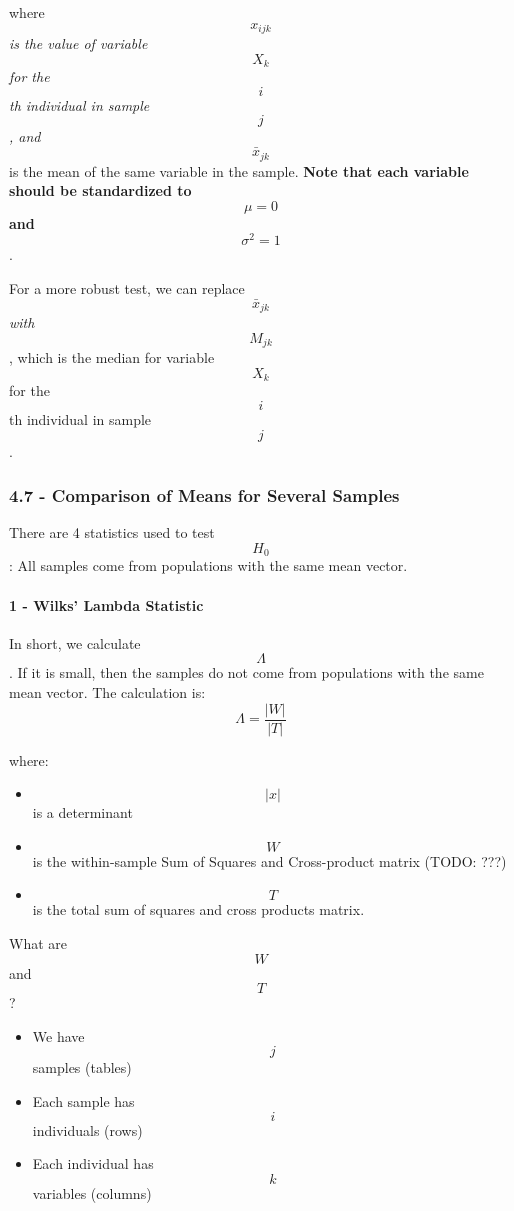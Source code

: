 where \[ x_{ijk} \] \emph{is the value of variable} \[X_k\] \emph{for
the} \[i\]\emph{th individual in sample} \[j\]\emph{, and}
\[\bar{x}_{jk}\] is the mean of the same variable in the sample.
\textbf{Note that each variable should be standardized to} \[\mu = 0\]
\textbf{and} \[\sigma^2 = 1\].

For a more robust test, we can replace \[\bar{x}_{jk}\] \emph{with}
\[ M_{jk} \], which is the median for variable \[X_k\] for the \[i\]th
individual in sample \[j\].

\hypertarget{comparison-of-means-for-several-samples}{%
\subsubsection{4.7 - Comparison of Means for Several
Samples}\label{comparison-of-means-for-several-samples}}

There are 4 statistics used to test \[H_0\]: All samples come from
populations with the same mean vector.

\hypertarget{wilks-lambda-statistic}{%
\paragraph{1 - Wilks' Lambda Statistic}\label{wilks-lambda-statistic}}

In short, we calculate \[\Lambda\]. If it is small, then the samples do
not come from populations with the same mean vector. The calculation is:
\[\Lambda = \frac{| W | }{| T |}\]

where:

\begin{itemize}
\tightlist
\item
  \[| x |\] is a determinant
\item
  \[W\] is the within-sample Sum of Squares and Cross-product matrix
  (TODO: ???)
\item
  \[T\] is the total sum of squares and cross products matrix.
\end{itemize}

What are \[W\] and \[T\]?

\begin{itemize}
\tightlist
\item
  We have \[j\] samples (tables)
\item
  Each sample has \[i\] individuals (rows)
\item
  Each individual has \[k\] variables (columns)
\end{itemize}

